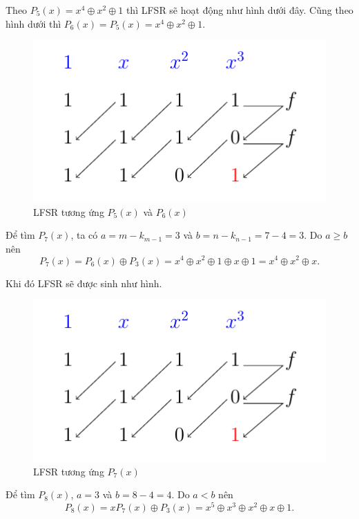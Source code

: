 \begin{example}
	Theo $P_5(x) = x^4 \oplus x^2 \oplus 1$ thì LFSR sẽ hoạt động như hình dưới đây. Cũng theo hình dưới thì $P_6(x) = P_5(x) = x^4 \oplus x^2 \oplus 1$. 
		
	\begin{figure}[htb]
		\centering
		\includegraphics[page=2]{figures/berlekamp_massey.pdf}
		\caption{LFSR tương ứng $P_5(x)$ và $P_6(x)$}
	\end{figure}
	
	Để tìm $P_7(x)$, ta có $a = m - k_{m-1} = 3$ và $b = n - k_{n-1} = 7 - 4 = 3$. Do $a \geqslant b$ nên
	\begin{equation*}
		P_7(x) = P_6(x) \oplus P_3(x) = x^4 \oplus x^2 \oplus 1 \oplus x \oplus 1 = x^4 \oplus x^2 \oplus x.
	\end{equation*}

	Khi đó LFSR sẽ được sinh như hình.

	\begin{figure}[htb]
		\centering
		\includegraphics[page=3]{figures/berlekamp_massey.pdf}
		\caption{LFSR tương ứng $P_7(x)$}
	\end{figure}

	Để tìm $P_8(x)$, $a = 3$ và $b = 8 - 4 = 4$. Do $a < b$ nên
	\begin{equation*}
		P_8(x) = x P_7(x) \oplus P_3(x) = x^5 \oplus x^3 \oplus x^2 \oplus x \oplus 1.
	\end{equation*}
	

\end{example}
